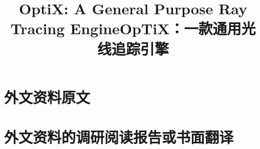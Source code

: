 \chapter{外文资料原文}
\label{cha:engorg}

\title{OptiX: A General Purpose Ray Tracing Engine}

\chapter{外文资料的调研阅读报告或书面翻译}

\title{OpTiX：一款通用光线追踪引擎}
